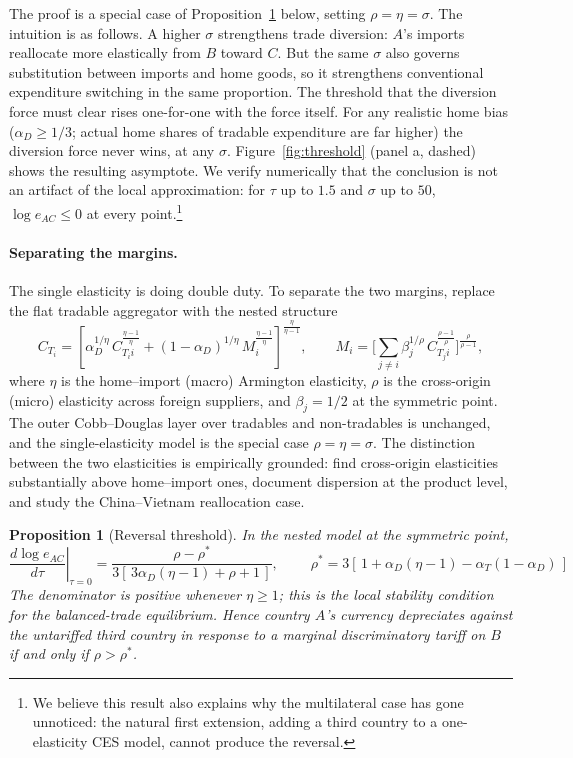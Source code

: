 \documentclass[11pt]{article}
\theoremstyle{plain}
\newtheorem{proposition}{Proposition}
\theoremstyle{remark}
\numberwithin{lemma}{section}
\numberwithin{proposition}{section}
\numberwithin{corollary}{section}
\newenvironment{revblock}{\par\begingroup\color{RevBlue}}{\endgroup\par}
\begin{document}
\begin{revblock}
The proof is a special case of Proposition~\ref{prop:threshold} below, setting $\rho = \eta = \sigma$. The intuition is as follows. A higher $\sigma$ strengthens trade diversion: $A$'s imports reallocate more elastically from $B$ toward $C$. But the same $\sigma$ also governs substitution between imports and home goods, so it strengthens conventional expenditure switching in the same proportion. The threshold that the diversion force must clear rises one-for-one with the force itself. For any realistic home bias ($\alpha_D \ge 1/3$; actual home shares of tradable expenditure are far higher) the diversion force never wins, at any $\sigma$. Figure~\ref{fig:threshold} (panel a, dashed) shows the resulting asymptote. We verify numerically that the conclusion is not an artifact of the local approximation: for $\tau$ up to $1.5$ and $\sigma$ up to $50$, $\log e_{AC} \le 0$ at every point.\footnote{We believe this result also explains why the multilateral case has gone unnoticed: the natural first extension, adding a third country to a one-elasticity CES model, cannot produce the reversal.}

\paragraph{Separating the margins.} The single elasticity is doing double duty. To separate the two margins, replace the flat tradable aggregator with the nested structure
\[
C_{T_i} = \left[ \alpha_D^{1/\eta}\, C_{T_i i}^{\frac{\eta-1}{\eta}} + (1-\alpha_D)^{1/\eta}\, M_i^{\frac{\eta-1}{\eta}} \right]^{\frac{\eta}{\eta-1}},
\qquad
M_i = \Bigg[ \sum_{j \neq i} \beta_j^{1/\rho}\, C_{T_j i}^{\frac{\rho-1}{\rho}} \Bigg]^{\frac{\rho}{\rho-1}},
\]
where $\eta$ is the home--import (macro) Armington elasticity, $\rho$ is the cross-origin (micro) elasticity across foreign suppliers, and $\beta_j = 1/2$ at the symmetric point. The outer Cobb--Douglas layer over tradables and non-tradables is unchanged, and the single-elasticity model is the special case $\rho = \eta = \sigma$. The distinction between the two elasticities is empirically grounded: \cite{feenstra2018} find cross-origin elasticities substantially above home--import ones, \cite{broda2006} document dispersion at the product level, and \cite{fajgelbaum2024trade} study the China--Vietnam reallocation case.

\begin{proposition}[Reversal threshold]
\label{prop:threshold}
In the nested model at the symmetric point,
\[
\left.\frac{d \log e_{AC}}{d\tau}\right|_{\tau=0}
= \frac{\rho - \rho^*}{3\left[\,3\alpha_D(\eta-1) + \rho + 1\,\right]},
\qquad
\boxed{\;\rho^* = 3\left[\,1 + \alpha_D(\eta - 1) - \alpha_T(1-\alpha_D)\,\right]\;}
\]
The denominator is positive whenever $\eta \ge 1$; this is the local stability condition for the balanced-trade equilibrium. Hence country $A$'s currency depreciates against the untariffed third country in response to a marginal discriminatory tariff on $B$ if and only if $\rho > \rho^*$.
\end{proposition}


\end{revblock}
\end{document}
